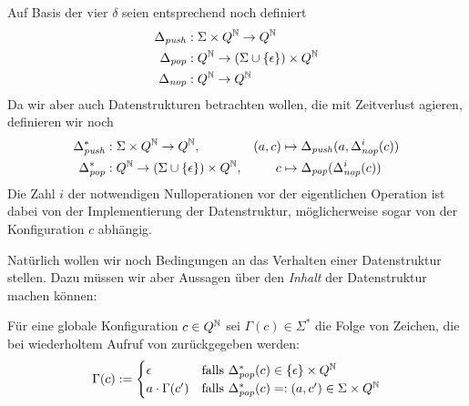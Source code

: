 \documentclass{article}
\begin{document}
Auf Basis der vier $\delta$ seien entsprechend noch definiert
\begin{align*}
    \Delta_{\mathit{push}} &: \Sigma \times Q^{\mathbb{N}} \rightarrow Q^{\mathbb{N}} \\
    \Delta_{\mathit{pop}} &: Q^{\mathbb{N}} \rightarrow (\Sigma \cup \{\epsilon\}) \times Q^{\mathbb{N}} \\
    \Delta_{\mathit{nop}} &: Q^{\mathbb{N}} \rightarrow Q^{\mathbb{N}}
\end{align*}
Da wir aber auch Datenstrukturen betrachten wollen, die mit Zeitverlust agieren, definieren wir noch
\begin{align*}
    \Delta^*_{\mathit{push}} &: \Sigma \times Q^{\mathbb{N}} \rightarrow Q^{\mathbb{N}},& (a,c) &\mapsto \Delta_{\mathit{push}}(a,\Delta^i_{\mathit{nop}}(c)) \\
    \Delta^*_{\mathit{pop}} &: Q^{\mathbb{N}} \rightarrow (\Sigma \cup \{\epsilon\}) \times Q^{\mathbb{N}},& c &\mapsto \Delta_{\mathit{pop}}(\Delta^i_{\mathit{nop}}(c))
\end{align*}
Die Zahl $i$ der notwendigen Nulloperationen vor der eigentlichen Operation ist dabei von der Implementierung der Datenstruktur, möglicherweise sogar von der Konfiguration $c$ abhängig.

Natürlich wollen wir noch Bedingungen an das Verhalten einer Datenstruktur stellen. Dazu müssen wir aber Aussagen über den \emph{Inhalt} der Datenstruktur machen können:
\begin{definition}
    Für eine globale Konfiguration $c \in Q^{\mathbb{N}}$ sei $\Gamma(c) \in \Sigma^*$ die Folge von Zeichen, die bei wiederholtem Aufruf von \pop zurückgegeben werden:
    \[ \Gamma(c) := \begin{cases}
            \epsilon &\text{falls } \Delta^*_{\mathit{pop}}(c) \in \{\epsilon\} \times Q^{\mathbb{N}} \\
        a \cdot \Gamma(c') &\text{falls }\Delta^*_{\mathit{pop}}(c)=:(a,c') \in \Sigma \times Q^{\mathbb{N}}
    \end{cases} \]
\end{definition}
\end{document}
